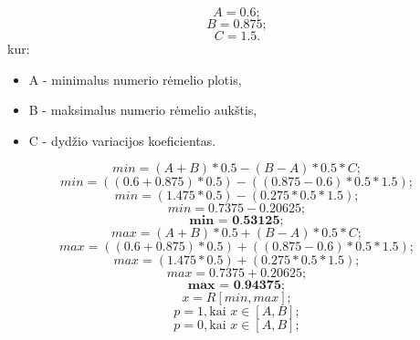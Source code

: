 \documentclass{VUMIFPSkursinis}
\begin{document}
\begin{equation}
  A = 0.6; 
\end{equation}
\begin{equation}
  B = 0.875;
\end{equation}
\begin{equation}
  C = 1.5.
\end{equation}
kur:
\begin{itemize}
  \item A - minimalus numerio rėmelio plotis,
  \item B - maksimalus numerio rėmelio aukštis,
  \item C - dydžio variacijos koeficientas.
\end{itemize}
\begin{equation}
  min = (A + B) * 0.5 - (B - A) * 0.5 * C;
\end{equation}
\begin{equation}
  min = ((0.6 + 0.875) * 0.5) - ((0.875 - 0.6) * 0.5 * 1.5);
\end{equation}
\begin{equation}
  min = (1.475 * 0.5) - (0.275 * 0.5 * 1.5);
\end{equation}
\begin{equation}
  min = 0.7375 - 0.20625;
\end{equation}
\begin{equation}
  \textbf{min = 0.53125};
\end{equation}
\begin{equation}
  max = (A + B) * 0.5 + (B - A) * 0.5 * C;
\end{equation}
\begin{equation}
  max = ((0.6 + 0.875) * 0.5) + ((0.875 - 0.6) * 0.5 * 1.5);
\end{equation}
\begin{equation}
  max = (1.475 * 0.5) + (0.275 * 0.5 * 1.5);
\end{equation}
\begin{equation}
  max = 0.7375 + 0.20625;
\end{equation}
\begin{equation}
  \textbf{max = 0.94375};
\end{equation}
\begin{equation}
  x = R[min, max];
\end{equation}
\begin{equation}
  p = 1, \text{kai } x \in [A, B];
\end{equation}
\begin{equation}
  p = 0, \text{kai } x \in [A, B];
\end{equation}
\end{document}
